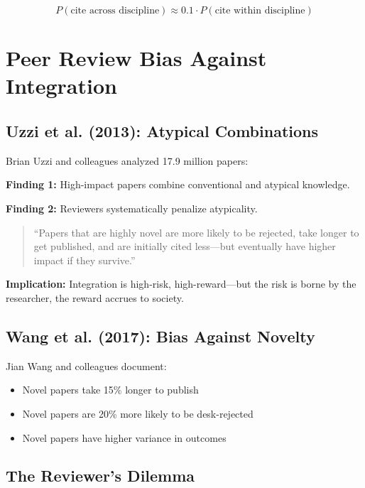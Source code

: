 \begin{equation}
P(\text{cite across discipline}) \approx 0.1 \cdot P(\text{cite within discipline})
\end{equation}



\section{Peer Review Bias Against Integration}
\label{sec:meta-peer-review}

\subsection{Uzzi et al. (2013): Atypical Combinations}

Brian Uzzi and colleagues analyzed 17.9 million papers:

\textbf{Finding 1:} High-impact papers combine conventional and atypical knowledge.

\textbf{Finding 2:} Reviewers systematically penalize atypicality.

\begin{quote}
``Papers that are highly novel are more likely to be rejected, take longer to get published, and are initially cited less—but eventually have higher impact if they survive.''
\end{quote}

\textbf{Implication:} Integration is high-risk, high-reward—but the risk is borne by the researcher, the reward accrues to society.

\subsection{Wang et al. (2017): Bias Against Novelty}

Jian Wang and colleagues document:
\begin{itemize}
\item Novel papers take 15\% longer to publish
\item Novel papers are 20\% more likely to be desk-rejected
\item Novel papers have higher variance in outcomes
\end{itemize}

\subsection{The Reviewer's Dilemma}


